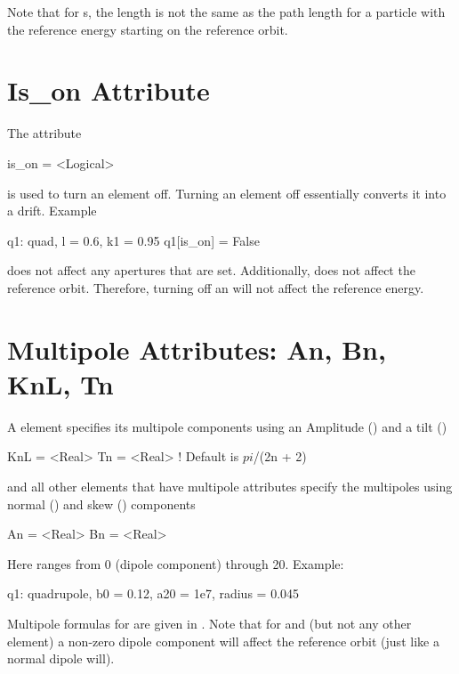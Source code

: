 Note that for s,
the length  is not the same as the path length for a particle
with the reference energy starting on the reference orbit.

\section{Is_on Attribute}
\label{s:is.on}

The  attribute
\begin{example}
  is_on = <Logical>
\end{example}
is used to turn an element off. Turning
an element off essentially converts it into a drift.
Example
\begin{example}
  q1: quad, l = 0.6, k1 = 0.95
  q1[is_on] = False
\end{example}

 does not affect any apertures that are set. Additionally,
 does not affect the reference orbit. Therefore, turning 
off an  will not affect the reference energy.

\section{Multipole Attributes: An, Bn, KnL, Tn}
\label{s:multip}

A  element specifies its multipole components using an
Amplitude () and a tilt ()
\begin{example}
  KnL = <Real>
  Tn  = <Real>  ! Default is $pi$/(2n + 2)
\end{example}
 and all other elements that
have multipole attributes specify the multipoles using normal
() and skew () components 
\begin{example}
  An = <Real>
  Bn = <Real>
\end{example}
Here  ranges from 0
(dipole component) through 20. Example:
\begin{example}
  q1: quadrupole, b0 = 0.12, a20 = 1e7, radius = 0.045
\end{example}

Multipole formulas for are given in .  Note that for
 and  (but not any other element) a
non-zero dipole component will affect the reference orbit (just like a
normal dipole will).

